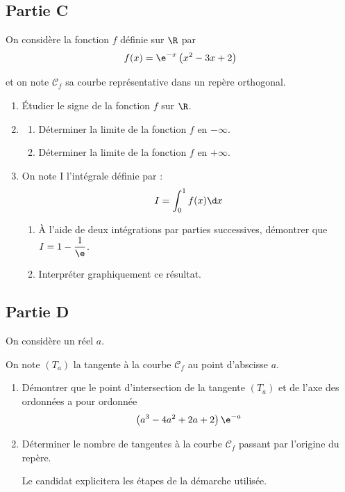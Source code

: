 \subsection*{Partie C}
On considère la fonction $f$ définie sur $\R$ par
\[f(x)=\e^{-x}\left(x^{2}-3 x+2\right)\]

et on note $\mathcal{C}_{f}$ sa courbe représentative dans un repère orthogonal.

\begin{enumerate}
	\item Étudier le signe de la fonction $f$ sur $\R$.

	\item \begin{enumerate}
		\item Déterminer la limite de la fonction $f$ en $-\infty$.

		\item Déterminer la limite de la fonction $f$ en $+\infty$.
	\end{enumerate}

	\item On note I l'intégrale définie par :
	\[I=\int_{0}^{1} f(x) \d x\]

	\begin{enumerate}
		\item À l'aide de deux intégrations par parties successives, démontrer que \quad $I=1-\dfrac{1}{\e}$.

		\item Interpréter graphiquement ce résultat.
	\end{enumerate}
\end{enumerate}

\subsection*{Partie D}
On considère un réel $a$.

On note $\left(T_{a}\right)$ la tangente à la courbe $\mathcal{C}_{f}$ au point d'abscisse $a$.

\begin{enumerate}
	\item Démontrer que le point d'intersection de la tangente $(T_{a})$ et de l'axe des ordonnées a pour ordonnée
	\[\left(a^{3}-4 a^{2}+2 a+2\right) \e^{-a}\]

	\item Déterminer le nombre de tangentes à la courbe $\mathcal{C}_{f}$ passant par l'origine du repère.

	Le candidat explicitera les étapes de la démarche utilisée.
\end{enumerate}
